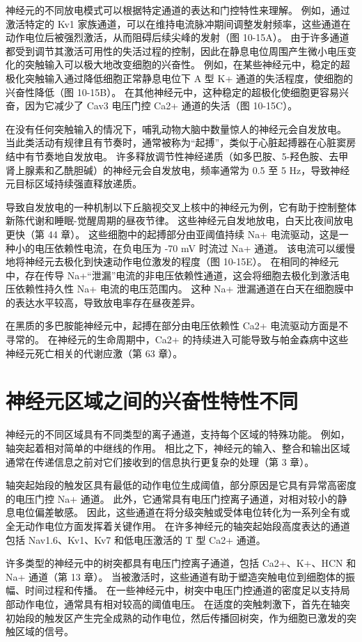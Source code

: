 神经元的不同放电模式可以根据特定通道的表达和门控特性来理解。 例如，通过激活特定的 Kv1 家族通道，可以在维持电流脉冲期间调整发射频率，这些通道在动作电位后被强烈激活，从而阻碍后续尖峰的发射（图 10-15A）。 由于许多通道都受到调节其激活可用性的失活过程的控制，因此在静息电位周围产生微小电压变化的突触输入可以极大地改变细胞的兴奋性。 例如，在某些神经元中，稳定的超极化突触输入通过降低细胞正常静息电位下 A 型 K+ 通道的失活程度，使细胞的兴奋性降低（图 10-15B）。 在其他神经元中，这种稳定的超极化使细胞更容易兴奋，因为它减少了 Cav3 电压门控 Ca2+ 通道的失活（图 10-15C）。

在没有任何突触输入的情况下，哺乳动物大脑中数量惊人的神经元会自发放电。 当此类活动有规律且有节奏时，通常被称为“起搏”，类似于心脏起搏器在心脏窦房结中有节奏地自发放电。 许多释放调节性神经递质（如多巴胺、5-羟色胺、去甲肾上腺素和乙酰胆碱）的神经元会自发放电，频率通常为 0.5 至 5 Hz，导致神经元目标区域持续强直释放递质。

导致自发放电的一种机制以下丘脑视交叉上核中的神经元为例，它有助于控制整体新陈代谢和睡眠-觉醒周期的昼夜节律。 这些神经元自发地放电，白天比夜间放电更快（第 44 章）。 这些细胞中的起搏部分由亚阈值持续 Na+ 电流驱动，这是一种小的电压依赖性电流，在负电压为 -70 mV 时流过 Na+ 通道。 该电流可以缓慢地将神经元去极化到快速动作电位激发的程度（图 10-15E）。 在相同的神经元中，存在传导 Na+“泄漏”电流的非电压依赖性通道，这会将细胞去极化到激活电压依赖性持久性 Na+ 电流的电压范围内。 这种 Na+ 泄漏通道在白天在细胞膜中的表达水平较高，导致放电率存在昼夜差异。

在黑质的多巴胺能神经元中，起搏在部分由电压依赖性 Ca2+ 电流驱动方面是不寻常的。 在神经元的生命周期中，Ca2+ 的持续进入可能导致与帕金森病中这些神经元死亡相关的代谢应激（第 63 章）。

\section{神经元区域之间的兴奋性特性不同}
神经元的不同区域具有不同类型的离子通道，支持每个区域的特殊功能。 例如，轴突起着相对简单的中继线的作用。 相比之下，神经元的输入、整合和输出区域通常在传递信息之前对它们接收到的信息执行更复杂的处理（第 3 章）。

轴突起始段的触发区具有最低的动作电位生成阈值，部分原因是它具有异常高密度的电压门控 Na+ 通道。 此外，它通常具有电压门控离子通道，对相对较小的静息电位偏差敏感。 因此，这些通道在将分级突触或受体电位转化为一系列全有或全无动作电位方面发挥着关键作用。 在许多神经元的轴突起始段高度表达的通道包括 Nav1.6、Kv1、Kv7 和低电压激活的 T 型 Ca2+ 通道。

许多类型的神经元中的树突都具有电压门控离子通道，包括 Ca2+、K+、HCN 和 Na+ 通道（第 13 章）。 当被激活时，这些通道有助于塑造突触电位到细胞体的振幅、时间过程和传播。 在一些神经元中，树突中电压门控通道的密度足以支持局部动作电位，通常具有相对较高的阈值电压。 在适度的突触刺激下，首先在轴突初始段的触发区产生完全成熟的动作电位，然后传播回树突，作为细胞已激发的突触区域的信号。

